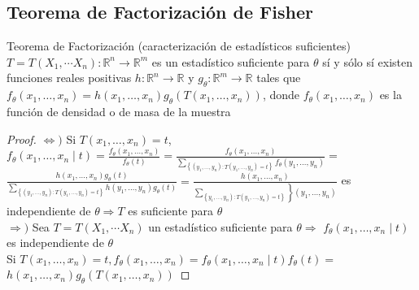 \subsection*{Teorema de Factorización de Fisher}

\begin{teorema}
Teorema de Factorización (caracterización de estadísticos suficientes) $T=T\left(X_{1}, \cdots X_{n}\right): \mathbb{R}^{n} \longrightarrow \mathbb{R}^{m}$ es un estadístico suficiente para $\theta$ sí y sólo sí existen funciones reales positivas $h: \mathbb{R}^{n} \longrightarrow \mathbb{R}$ y $g_{\theta}: \mathbb{R}^{m} \longrightarrow \mathbb{R}$ tales que $f_{\theta}\left(x_{1}, \ldots, x_{n}\right)=h\left(x_{1}, \ldots, x_{n}\right) g_{\theta}\left(T\left(x_{1}, \ldots, x_{n}\right)\right)$, donde $f_{\theta}\left(x_{1}, \ldots, x_{n}\right)$ es la función de densidad o de masa de la muestra
\end{teorema}


\begin{proof}
\leavevmode
$\Leftrightarrow)$ Si $T\left(x_{1}, \ldots, x_{n}\right)=t$,\\
$f_{\theta}\left(x_{1}, \ldots, x_{n} \mid t\right)=\frac{f_{\theta}\left(x_{1}, \ldots, x_{n}\right)}{f_{\theta}(t)}=\frac{f_{\theta}\left(x_{1}, \ldots, x_{n}\right)}{\sum_{\left\{\left(y_{1}, \ldots, y_{n}\right): T\left(y_{1}, \ldots, y_{n}\right)=t\right\}} f_{\theta}\left(y_{1}, \ldots, y_{n}\right)}=$\\
$\frac{h\left(x_{1}, \ldots, x_{n}\right) g_{\theta}(t)}{\sum_{\left\{\left(y_{1}, \ldots, y_{n}\right): T\left(y_{1}, \ldots, y_{n}\right)=t\right\}} h\left(y_{1}, \ldots, y_{n}\right) g_{\theta}(t)}=\frac{h\left(x_{1}, \ldots, x_{n}\right)}{\left.\sum_{\left.\left\{y_{1}, \ldots, y_{n}\right): T\left(y_{1}, \ldots, y_{n}\right)=t\right\}}\right\}\left(y_{1}, \ldots, y_{n}\right)}$ es\\
independiente de $\theta \Rightarrow T$ es suficiente para $\theta$\\
$\Rightarrow)$ Sea $T=T\left(X_{1}, \cdots X_{n}\right)$ un estadístico suficiente para $\theta \Rightarrow$ $f_{\theta}\left(x_{1}, \ldots, x_{n} \mid t\right)$ es independiente de $\theta$\\
Si $T\left(x_{1}, \ldots, x_{n}\right)=t, f_{\theta}\left(x_{1}, \ldots, x_{n}\right)=f_{\theta}\left(x_{1}, \ldots, x_{n} \mid t\right) f_{\theta}(t)=$ $h\left(x_{1}, \ldots, x_{n}\right) g_{\theta}\left(T\left(x_{1}, \ldots, x_{n}\right)\right)$
\end{proof}



